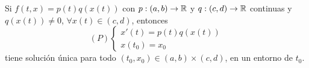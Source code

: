 \begin{theorem}
Si $\displaystyle f\left(t,x\right) = p\left(t\right)q\left(x\left(t\right)\right) $ con $\displaystyle p : \left(a,b\right)\to \mathbb{R} $ y $\displaystyle q : \left(c,d\right) \to \mathbb{R} $ continuas y $\displaystyle q\left(x\left(t\right)\right) \neq 0 $, $\displaystyle \forall x\left(t\right) \in \left(c,d\right) $, entonces 
\[ \left(P\right) 
\begin{cases}
x'\left(t\right) = p\left(t\right)q\left(x\left(t\right)\right) \\
x\left(t_{0}\right) = x_{0}
\end{cases}
\]
tiene solución única para todo $\displaystyle \left(t_{0}, x_{0}\right) \in \left(a,b\right)\times \left(c,d\right) $, en un entorno de $\displaystyle t_{0} $.
\end{theorem}

